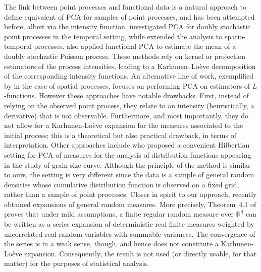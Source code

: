 \documentclass[aos]{imsart}
\theoremstyle{plain}
\theoremstyle{remark}
\newcommand{\R}{\mathbb{R}}
\newcommand{\1}{1}
\begin{document}
The link between point processes and functional data is a natural approach to define equivalent of PCA for samples of point processes, and has been attempted before, albeit via the intensity function. \cite{WMZ13} investigated PCA for doubly stochastic point processes in the temporal setting, while \cite{LG14} extended the analysis to spatio-temporal processes. \cite{BVAR06} also applied functional PCA to estimate the mean of a doubly stochastic Poisson process. These methods rely on kernel or projection estimators of the process intensities, leading to a Karhunen–Loève decomposition of the corresponding intensity functions. An alternative line of work, exemplified by \cite{BGMSS06} in the case of spatial processes, focuses on performing PCA on estimators of $L$-functions. However these approaches have notable drawbacks. First, instead of relying on the observed point process, they relate to an intensity (heuristically, a derivative) that is not observable. Furthermore, and most importantly, they do not allow for a Karhunen-Lo\`eve expansion for the measures associated to the initial process; this is a theoretical but also practical drawback, in terms of interpretation.  Other approaches include \cite{MYD07} who proposed a convenient Hilbertian setting for PCA of measures for the analysis of distribution functions appearing in the study of grain-size curve. Although the principle of the method is similar to ours, the setting is very different since the data is a sample of general random densities whose cumulative distribution function is observed on a fixed grid, rather than a sample of point processes.
 Closer in spirit to our approach, \cite{Carrizo22} recently obtained expansions of general random measures. More precisely, Theorem~4.1 of \cite{Carrizo22} proves that under mild assumptions, a finite regular random measure over $\R^d$ can be written as a series expansion of deterministic real finite measures weighted by uncorrelated real random variables with summable variances. The convergence of the series is in a weak sense, though, and hence does not constitute a Karhunen-Lo\`eve expansion. Consequently, the result is not used (or directly usable, for that matter) for the purposes of statistical analysis. 
\end{document}
